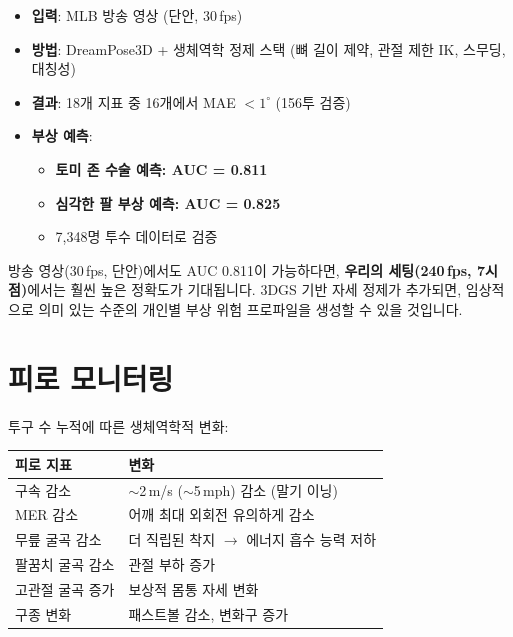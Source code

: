 \documentclass[11pt, a4paper]{report}
\begin{document}
\begin{cvbox}[title={방송 영상 기반 부상 예측 (Bright et al., 2026)}]
\begin{itemize}[leftmargin=*]
  \item \textbf{입력}: MLB 방송 영상 (단안, 30\,fps)
  \item \textbf{방법}: DreamPose3D + 생체역학 정제 스택 (뼈 길이 제약, 관절 제한 IK, 스무딩, 대칭성)
  \item \textbf{결과}: 18개 지표 중 16개에서 MAE $< 1^\circ$ (156투 검증)
  \item \textbf{부상 예측}:
  \begin{itemize}
    \item \textbf{토미 존 수술 예측: AUC = 0.811}
    \item \textbf{심각한 팔 부상 예측: AUC = 0.825}
    \item 7,348명 투수 데이터로 검증
  \end{itemize}
\end{itemize}
\end{cvbox}

\begin{importantnote}
방송 영상(30\,fps, 단안)에서도 AUC 0.811이 가능하다면, \textbf{우리의 세팅(240\,fps, 7시점)}에서는 훨씬 높은 정확도가 기대됩니다. 3DGS 기반 자세 정제가 추가되면, 임상적으로 의미 있는 수준의 개인별 부상 위험 프로파일을 생성할 수 있을 것입니다.
\end{importantnote}


\section{피로 모니터링}

투구 수 누적에 따른 생체역학적 변화:

\begin{center}
\renewcommand{\arraystretch}{1.3}
\begin{tabular}{lp{7cm}}
\toprule
\textbf{피로 지표} & \textbf{변화} \\
\midrule
구속 감소 & $\sim$2\,m/s ($\sim$5\,mph) 감소 (말기 이닝) \\
MER 감소 & 어깨 최대 외회전 유의하게 감소 \\
무릎 굴곡 감소 & 더 직립된 착지 $\rightarrow$ 에너지 흡수 능력 저하 \\
팔꿈치 굴곡 감소 & 관절 부하 증가 \\
고관절 굴곡 증가 & 보상적 몸통 자세 변화 \\
구종 변화 & 패스트볼 감소, 변화구 증가 \\
\bottomrule
\end{tabular}
\end{center}
\end{document}
